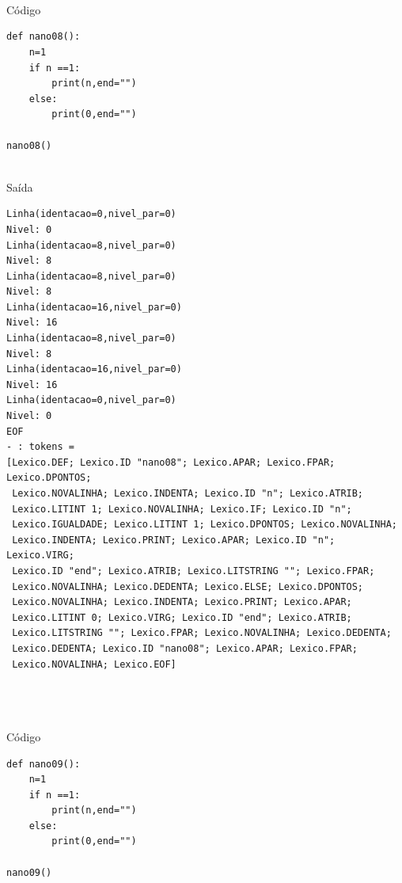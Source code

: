 \documentclass{article}
\begin{document}

\\\\\\Código
\begin{lstlisting}
def nano08():
	n=1
	if n ==1:
		print(n,end="")
	else:
		print(0,end="")

nano08()
\end{lstlisting}

\\Saída
\begin{lstlisting}
Linha(identacao=0,nivel_par=0)
Nivel: 0
Linha(identacao=8,nivel_par=0)
Nivel: 8
Linha(identacao=8,nivel_par=0)
Nivel: 8
Linha(identacao=16,nivel_par=0)
Nivel: 16
Linha(identacao=8,nivel_par=0)
Nivel: 8
Linha(identacao=16,nivel_par=0)
Nivel: 16
Linha(identacao=0,nivel_par=0)
Nivel: 0
EOF
- : tokens =
[Lexico.DEF; Lexico.ID "nano08"; Lexico.APAR; Lexico.FPAR; Lexico.DPONTOS;
 Lexico.NOVALINHA; Lexico.INDENTA; Lexico.ID "n"; Lexico.ATRIB;
 Lexico.LITINT 1; Lexico.NOVALINHA; Lexico.IF; Lexico.ID "n";
 Lexico.IGUALDADE; Lexico.LITINT 1; Lexico.DPONTOS; Lexico.NOVALINHA;
 Lexico.INDENTA; Lexico.PRINT; Lexico.APAR; Lexico.ID "n"; Lexico.VIRG;
 Lexico.ID "end"; Lexico.ATRIB; Lexico.LITSTRING ""; Lexico.FPAR;
 Lexico.NOVALINHA; Lexico.DEDENTA; Lexico.ELSE; Lexico.DPONTOS;
 Lexico.NOVALINHA; Lexico.INDENTA; Lexico.PRINT; Lexico.APAR;
 Lexico.LITINT 0; Lexico.VIRG; Lexico.ID "end"; Lexico.ATRIB;
 Lexico.LITSTRING ""; Lexico.FPAR; Lexico.NOVALINHA; Lexico.DEDENTA;
 Lexico.DEDENTA; Lexico.ID "nano08"; Lexico.APAR; Lexico.FPAR;
 Lexico.NOVALINHA; Lexico.EOF]
\end{lstlisting}



\\\\\\Código
\begin{lstlisting}
def nano09():
	n=1
	if n ==1:
		print(n,end="")
	else:
		print(0,end="")

nano09()
\end{lstlisting}
\end{document}
